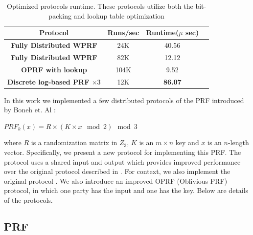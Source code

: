 \begin{table}[htbp]
	\begin{center}
		\begin{tabular}{|c|c|c|c|}
			\hline
			\textbf{Protocol} & \textbf{Runs/sec} & \textbf{Runtime($\mu$ sec)} \\
			\hline
			\hline
			\textbf{Fully Distributed WPRF\cite{darkmatter}} & 24K & 40.56  \\
			\hline
			\textbf{Fully Distributed WPRF} &  82K &  12.12\\
			\hline
			\textbf{OPRF with lookup} &  104K &  9.52 \\
			\hline
			\textbf{Discrete log-based PRF $\times 3$} & 12K &\textbf{86.07}\\
			\hline
			
		\end{tabular}
		
		\vspace{-1mm}
		\caption{Optimized protocols runtime. These protocols utilize both the bit-packing and lookup table optimization}
		\label{RuntimeTable}
	\end{center}
	\vspace{-5mm}
\end{table}


\iffalse

In this work we implemented a few distributed protocols of the PRF introduced by Boneh et. Al  \cite{darkmatter}:

$PRF_k(x) = R \times (K \times x \mod 2)  \mod 3 $

where $R$ is a randomization matrix in $Z_3$, $K$ is an $m \times n$ key and $x$ is an $n$-length vector. Specifically, we present a new protocol for implementing this PRF. The protocol uses a shared input and output which provides improved performance over the original protocol described in \cite{darkmatter}. For context, we also implement the original protocol \cite{darkmatter} . We also introduce an improved OPRF (Oblivious PRF) protocol, in which one party has the input and one has the key. Below are  details of the protocols.

\subsection{PRF}


